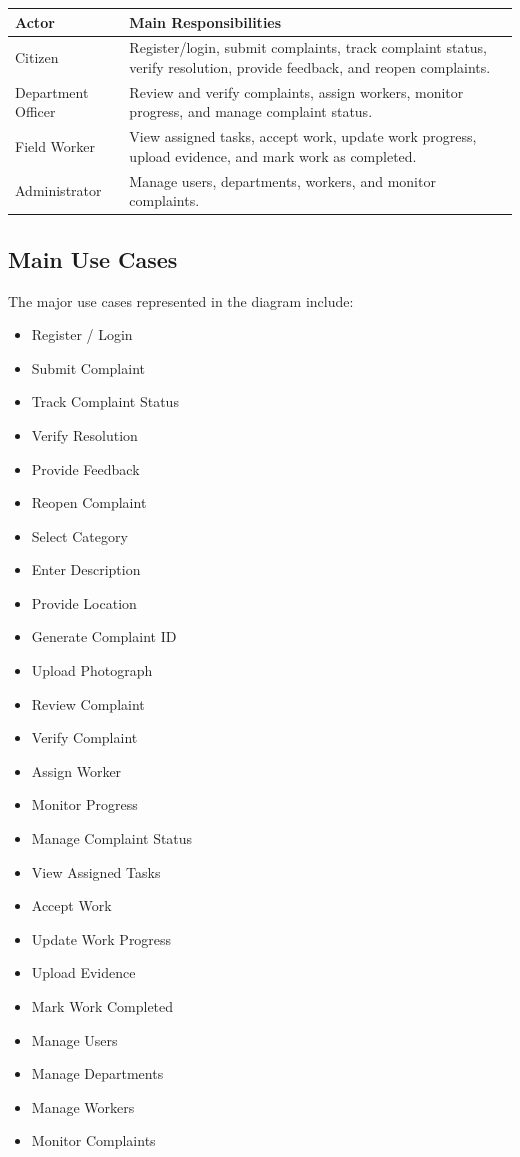 \documentclass[12pt,a4paper]{article}
\begin{document}
\begin{longtable}{p{} p{}}
\toprule
\textbf{Actor} & \textbf{Main Responsibilities} \\
\midrule
Citizen &
Register/login, submit complaints, track complaint status, verify resolution, provide feedback, and reopen complaints. \\

Department Officer &
Review and verify complaints, assign workers, monitor progress, and manage complaint status. \\

Field Worker &
View assigned tasks, accept work, update work progress, upload evidence, and mark work as completed. \\

Administrator &
Manage users, departments, workers, and monitor complaints. \\
\bottomrule
\end{longtable}

\subsection{Main Use Cases}

The major use cases represented in the diagram include:

\begin{itemize}[leftmargin=*]
\item Register / Login
\item Submit Complaint
\item Track Complaint Status
\item Verify Resolution
\item Provide Feedback
\item Reopen Complaint
\item Select Category
\item Enter Description
\item Provide Location
\item Generate Complaint ID
\item Upload Photograph
\item Review Complaint
\item Verify Complaint
\item Assign Worker
\item Monitor Progress
\item Manage Complaint Status
\item View Assigned Tasks
\item Accept Work
\item Update Work Progress
\item Upload Evidence
\item Mark Work Completed
\item Manage Users
\item Manage Departments
\item Manage Workers
\item Monitor Complaints
\end{itemize}
\end{document}
